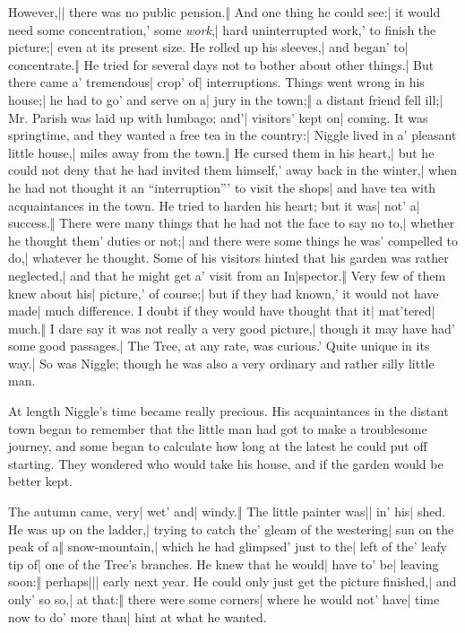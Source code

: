 \onlyscore{\enlargethispage{4\baselineskip}}
\begin{itemize}
\halftwo However,|| there was no public pension.‖ And one thing he could see:| it would need some concentration,' some \emph{work},| hard uninterrupted work,' to finish the picture;| even at its present size.
\halfone He rolled up his sleeves,| and began' to| concentrate.‖ He tried for several days not to bother about other things.| But there came a' tremendous| crop' of| interruptions.
\halftwo Things went wrong in his house;| he had to go' and serve on a| jury in the town;‖ a distant friend fell ill;| Mr. Parish was laid up with lumbago; and'| visitors' kept on| coming.
\halfone It was springtime, and they wanted a free tea in the country:| Niggle lived in a' pleasant little house,| miles away from the town.‖ He cursed them in his heart,| but he could not deny that he had invited them himself,' away back in the winter,| when he had not thought it an “interruption”' to visit the shops| and have tea with acquaintances in the town.
\halftwo He tried to harden his heart; but it was| not' a| success.‖ There were many things that he had not the face to say no to,| whether he thought them' duties or not;| and there were some things he was' compelled to do,| whatever he thought.
\halfone Some of his visitors hinted that his garden was rather neglected,| and that he might get a' visit from an In|spector.‖ Very few of them knew about his| picture,' of course;| but if they had known,' it would not have made| much difference.
\halftwo I doubt if they would have thought that it| mat'tered| much.‖ I dare say it was not really a very good picture,| though it may have had' some good passages.| The Tree, at any rate, was curious.' Quite unique in its way.| So was Niggle; though he was also a very ordinary and rather silly little man.
\end{itemize}

At length Niggle’s time became really precious. His acquaintances in the distant town began to remember that the little man had got to make a troublesome journey, and some began to calculate how long at the latest he could put off starting. They wondered who would take his house, and if the garden would be better kept.


\begin{itemize}
\halfone The autumn came, very| wet' and| windy.‖ The little painter was|| in' his| shed.
\halftwo He was up on the ladder,| trying to catch the' gleam of the westering| sun on the peak of a‖ snow-mountain,| which he had glimpsed' just to the| left of the' leafy tip of| one of the Tree’s branches.
\halfone He knew that he would| have to' be| leaving soon:‖ perhaps||| early next year.
\halftwo He could only just get the picture finished,| and only' so so,| at that:‖ there were some corners| where he would not' have| time now to do' more than| hint at what he wanted.
\end{itemize}

